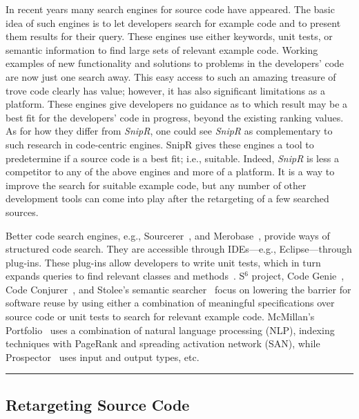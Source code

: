 In recent years many search engines for source code have appeared. The basic idea of such engines is to let developers search for example code and to present them results for their query. These engines use either keywords, unit tests, or semantic information to find large sets of relevant example code. Working examples of new functionality and solutions to problems in the developers’ code are now just one search away. This easy access to such an amazing treasure of trove code clearly has value; however, it has also significant limitations as a platform. These engines give developers no guidance as to which result may be a best fit for the developers' code in progress, beyond the existing ranking values. As for how they differ from \emph{SnipR}, one could see \emph{SnipR} as complementary to such research in code-centric engines. SnipR gives these engines a tool to predetermine if a source code is a best fit; i.e., suitable. Indeed, \emph{SnipR} is less a competitor to any of the above engines and more of a platform. It is a way to improve the search for suitable example code, but any number of other development tools can come into play after the retargeting of a few searched sources. 
         
Better code search engines, e.g., Sourcerer~\cite{Bajracharya:2006vn}, and Merobase~\cite{Hummel:eq}, provide ways of structured code search. They are accessible through IDEs---e.g., Eclipse---through plug-ins. These plug-ins allow developers to write unit tests, which in turn expands queries to find relevant classes and methods~\cite{Hummel:eq}. S$^{6}$ project\cite{Reiss:2009fu}, Code Genie~\cite{LazzariniLemos:2007jh}, Code Conjurer~\cite{Hummel:eq}, and Stolee's semantic searcher~\cite{Stolee:2012wp} focus on lowering the barrier for software reuse by using either a combination of meaningful specifications over source code or unit tests to search for relevant example code. McMillan's Portfolio~\cite{McMillan:2011cm, McMillan:2011wq} uses a combination of natural language processing (NLP), indexing techniques with PageRank and spreading activation network (SAN), while Prospector~\cite{Mandelin:2005uj} uses input and output types, etc.

\fancybreak{\pfbreakdisplay}

\subsection{Retargeting Source Code}
\label{sec:retargetingcode}



